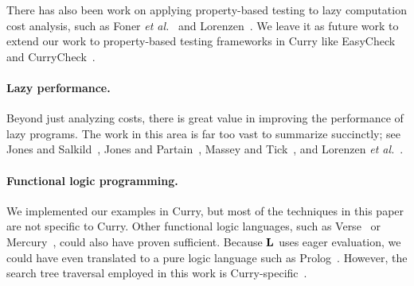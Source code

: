 There has also been work on applying property-based testing to lazy
computation cost analysis, such as Foner \textit{et al.}~\cite{foner2018} and
Lorenzen~\cite{lazy-amortized-testing}. We leave it as future work to extend our
work to property-based testing frameworks in Curry like
EasyCheck~\cite{easy-check} and CurryCheck~\cite{curry-check}.

\ifextended
\paragraph{Lazy performance.}
Beyond just analyzing costs, there is great value in improving the performance
of lazy programs. The work in this area is far too vast to summarize succinctly;
see Jones and Salkild~\cite{DBLP:conf/fpca/JonesS89}, Jones and
Partain~\cite{strictness-analysis}, Massey and
Tick~\cite{DBLP:conf/ifipPACT/MasseyT94}, and Lorenzen \textit{et
  al.}~\cite{10.1145/3747530}.
\fi

\paragraph{Functional logic programming.}
We implemented our examples in Curry, but most of the techniques in this paper
are not specific to Curry. Other functional logic languages, such as
Verse~\cite{verse} or Mercury~\cite{mercury}, could also have proven sufficient.
Because \(\mathbf{L}\) uses eager evaluation, we could have even translated to a pure
logic language such as Prolog~\cite{EagerFLPIsLogic}. However, the search tree
traversal employed in this work is
Curry-specific~\cite{DBLP:journals/jflp/BrasselHH04}.

